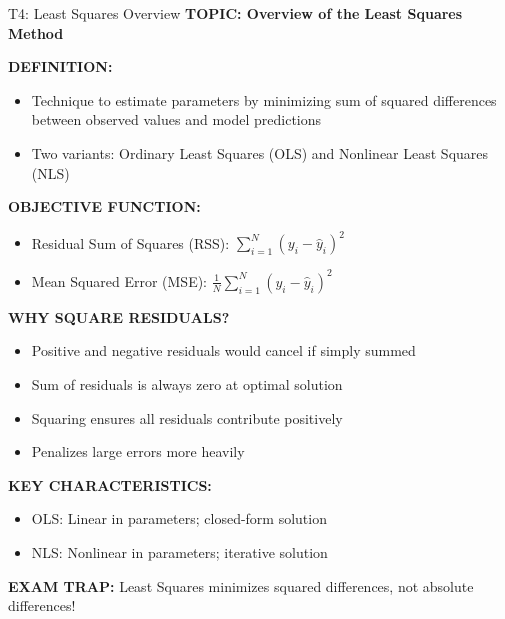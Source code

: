 \documentclass[8pt]{beamer}
\begin{document}
	\begin{frame}{T4: Least Squares Overview}
		\fontsize{6.5}{7.5}\selectfont
		\textbf{TOPIC: Overview of the Least Squares Method}
		
		\vspace{0.1cm}
		\textbf{DEFINITION:}
		\begin{itemize}
			\item Technique to estimate parameters by minimizing sum of squared differences between observed values and model predictions
			\item Two variants: Ordinary Least Squares (OLS) and Nonlinear Least Squares (NLS)
		\end{itemize}
		
		\vspace{0.1cm}
		\textbf{OBJECTIVE FUNCTION:}
		\begin{itemize}
			\item Residual Sum of Squares (RSS): $\sum_{i=1}^N (y_i - \hat{y}_i)^2$
			\item Mean Squared Error (MSE): $\frac{1}{N}\sum_{i=1}^N (y_i - \hat{y}_i)^2$
		\end{itemize}
		
		\vspace{0.1cm}
		\textbf{WHY SQUARE RESIDUALS?}
		\begin{itemize}
			\item Positive and negative residuals would cancel if simply summed
			\item Sum of residuals is always zero at optimal solution
			\item Squaring ensures all residuals contribute positively
			\item Penalizes large errors more heavily
		\end{itemize}
		
		\vspace{0.1cm}
		\textbf{KEY CHARACTERISTICS:}
		\begin{itemize}
			\item \textcolor{myblue}{OLS:} Linear in parameters; closed-form solution
			\item \textcolor{myblue}{NLS:} Nonlinear in parameters; iterative solution
		\end{itemize}
		
		\textcolor{myred}{\textbf{EXAM TRAP:}} Least Squares minimizes \textcolor{myblue}{squared} differences, not absolute differences!
	\end{frame}
	
\end{document}
